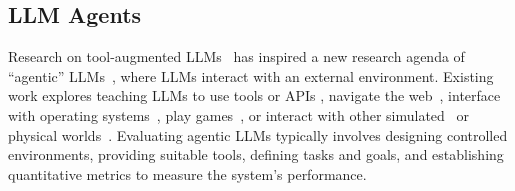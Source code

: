 


\subsection{LLM Agents}
Research on tool-augmented LLMs~ \citep{schick2023toolformerlanguagemodelsteach} has inspired a new research agenda of “agentic” LLMs~\citep{kaddour2023challenges, wangSurveyLargeLanguage2024}, where LLMs interact with an external environment. Existing work explores teaching LLMs to use tools or APIs \citep{schick2023toolformerlanguagemodelsteach, qin2023toolllmfacilitatinglargelanguage}, navigate the web~\citep{nakano2022webgptbrowserassistedquestionansweringhuman, deng2023mind2webgeneralistagentweb, zhou2023webarena}, interface with operating systems~\citep{wu2024copilot}, play games~\citep{paglieri2024balrog,wang2023voyager}, or interact with other simulated~\citep{wang2024userbehaviorsimulationlarge, lin2023agentsimsopensourcesandboxlarge} or physical worlds~\citep{zhang2024buildingcooperativeembodiedagents}. Evaluating agentic LLMs typically involves designing controlled environments, providing suitable tools, defining tasks and goals, and establishing quantitative metrics to measure the system’s performance.

